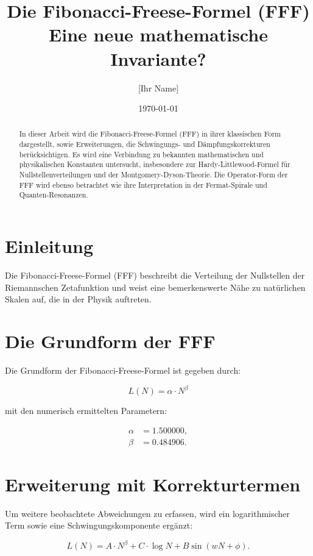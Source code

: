 \documentclass[a4paper,12pt]{article}
\title{Die Fibonacci-Freese-Formel (FFF) \\ Eine neue mathematische Invariante?}
\author{[Ihr Name]}
\date{\today}
\begin{document}
\maketitle

\begin{abstract}
In dieser Arbeit wird die Fibonacci-Freese-Formel (FFF) in ihrer klassischen Form dargestellt, sowie Erweiterungen, die Schwingungs- und Dämpfungskorrekturen berücksichtigen. Es wird eine Verbindung zu bekannten mathematischen und physikalischen Konstanten untersucht, insbesondere zur Hardy-Littlewood-Formel für Nullstellenverteilungen und der Montgomery-Dyson-Theorie. Die Operator-Form der FFF wird ebenso betrachtet wie ihre Interpretation in der Fermat-Spirale und Quanten-Resonanzen.
\end{abstract}

\section{Einleitung}
Die Fibonacci-Freese-Formel (FFF) beschreibt die Verteilung der Nullstellen der Riemannschen Zetafunktion und weist eine bemerkenswerte Nähe zu natürlichen Skalen auf, die in der Physik auftreten.

\section{Die Grundform der FFF}
Die Grundform der Fibonacci-Freese-Formel ist gegeben durch:

\begin{equation}
L(N) = \alpha \cdot N^\beta
\end{equation}

mit den numerisch ermittelten Parametern:

\begin{align*}
\alpha &= 1.500000, \\
\beta &= 0.484906.
\end{align*}

\section{Erweiterung mit Korrekturtermen}
Um weitere beobachtete Abweichungen zu erfassen, wird ein logarithmischer Term sowie eine Schwingungskomponente ergänzt:

\begin{equation}
L(N) = A \cdot N^\beta + C \cdot \log N + B \sin(w N + \phi).
\end{equation}
\end{document}
